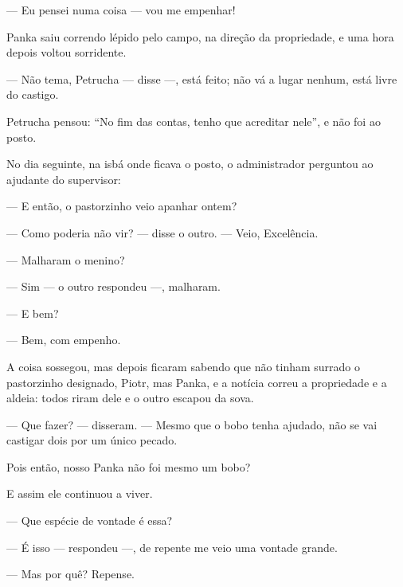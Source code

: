 --- Eu pensei numa coisa --- vou me empenhar!

Panka saiu correndo lépido pelo campo, na direção da propriedade, e
uma hora depois voltou sorridente.

--- Não tema, Petrucha --- disse ---, está feito; não vá a lugar nenhum,
está livre do castigo.

Petrucha pensou: ``No fim das contas, tenho que acreditar nele'', e não
foi ao posto.

No dia seguinte, na isbá onde ficava o posto, o administrador perguntou
ao ajudante do supervisor:

--- E então, o pastorzinho veio apanhar ontem?

--- Como poderia não vir? --- disse o outro. --- Veio, Excelência.

--- Malharam o menino?

--- Sim --- o outro respondeu ---, malharam.

--- E bem?

--- Bem, com empenho.

A coisa sossegou, mas depois ficaram sabendo que não tinham surrado o
pastorzinho designado, Piotr, mas Panka, e a notícia correu a
propriedade e a aldeia: todos riram dele e o outro escapou da sova.

--- Que fazer? --- disseram. --- Mesmo que o bobo tenha ajudado, não se
vai castigar dois por um único pecado.

Pois então, nosso Panka não foi mesmo um bobo?

E assim ele continuou a viver.



--- Que espécie de vontade é essa?

--- É isso --- respondeu ---, de repente me veio uma vontade grande.

--- Mas por quê? Repense.

